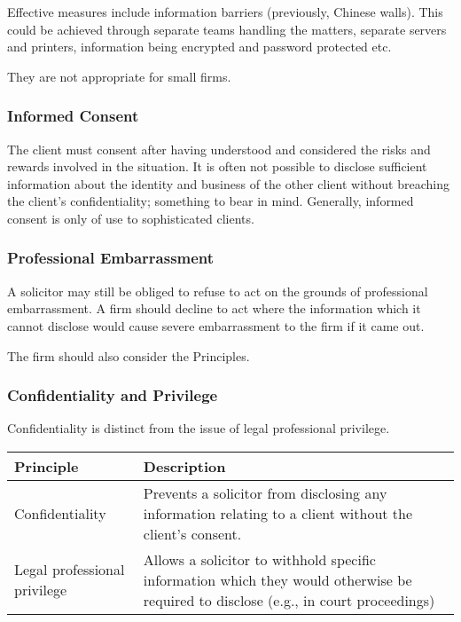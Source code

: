 \documentclass[
]{article}
\begin{document}
Effective measures include information barriers (previously, Chinese
walls). This could be achieved through separate teams handling the
matters, separate servers and printers, information being encrypted and
password protected etc.

They are not appropriate for small firms.

\hypertarget{informed-consent}{%
\subsubsection{Informed Consent}\label{informed-consent}}

The client must consent after having understood and considered the risks
and rewards involved in the situation. It is often not possible to
disclose sufficient information about the identity and business of the
other client without breaching the client's confidentiality; something
to bear in mind. Generally, informed consent is only of use to
sophisticated clients.

\hypertarget{professional-embarrassment}{%
\subsubsection{Professional
Embarrassment}\label{professional-embarrassment}}

A solicitor may still be obliged to refuse to act on the grounds of
professional embarrassment. A firm should decline to act where the
information which it cannot disclose would cause severe embarrassment to
the firm if it came out.

The firm should also consider the Principles.

\hypertarget{confidentiality-and-privilege}{%
\subsubsection{Confidentiality and
Privilege}\label{confidentiality-and-privilege}}

Confidentiality is distinct from the issue of legal professional
privilege.

\begin{longtable}[]{@{}ll@{}}
\toprule()
Principle & Description \\
\midrule()
\endhead
Confidentiality & Prevents a solicitor from disclosing any information
relating to a client without the client's consent. \\
Legal professional privilege & Allows a solicitor to withhold specific
information which they would otherwise be required to disclose (e.g., in
court proceedings) \\
\bottomrule()
\end{longtable}
\end{document}
